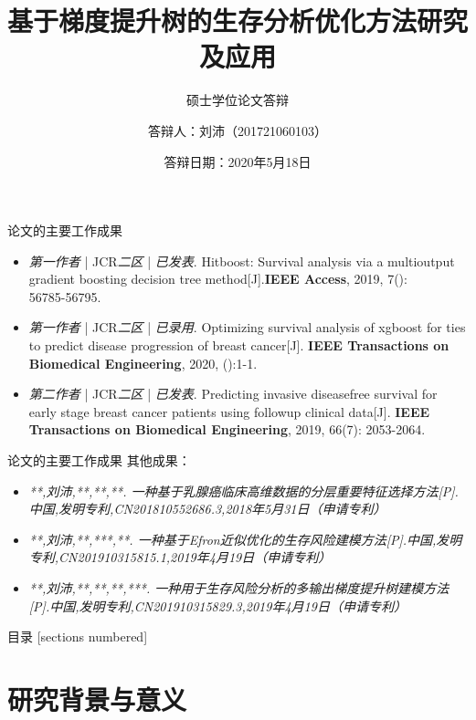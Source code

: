 \documentclass[10pt]{beamer}
\title{基于梯度提升树的生存分析优化方法研究及应用}
\subtitle{硕士学位论文答辩}
\date{答辩日期：2020年5月18日}
\author{答辩人：刘沛（201721060103）}
\institute{电子科技大学计算机科学与工程学院}
\begin{document}
\maketitle

\begin{frame}{论文的主要工作成果}
  \begin{itemize}
    \item \textit{第一作者} | JCR\textit{二区} | \textit{已发表}. Hitboost: Survival analysis via a multi­output gradient boosting decision tree method[J].\textbf{IEEE Access}, 2019, 7(): 56785­-56795.
    \item \textit{第一作者} | JCR\textit{二区} | \textit{已录用}. Optimizing survival analysis of xgboost for ties to predict disease progression of breast cancer[J]. \textbf{IEEE Transactions on Biomedical Engineering}, 2020, ():1-1.
    \item \textit{第二作者} | JCR\textit{二区} | \textit{已发表}. Predicting invasive disease­free survival for early stage breast cancer patients using follow­up clinical data[J]. \textbf{IEEE Transactions on Biomedical Engineering}, 2019, 66(7): 2053­-2064.
  \end{itemize}
\end{frame}

\begin{frame}{论文的主要工作成果}
  其他成果：
  \begin{itemize}
    \item \textit{**,刘沛,**,**,**. 一种基于乳腺癌临床高维数据的分层重要特征选择方法[P].中国,发明专利,CN201810552686.3,2018年5月31日（申请专利）}
    \item \textit{**,刘沛,**,***,**. 一种基于Efron近似优化的生存风险建模方法[P].中国,发明专利,CN201910315815.1,2019年4月19日（申请专利）}
    \item \textit{**,刘沛,**,**,**,***. 一种用于生存风险分析的多输出梯度提升树建模方法[P].中国,发明专利,CN201910315829.3,2019年4月19日（申请专利）}
  \end{itemize}
\end{frame}

\begin{frame}{目录}
  [sections numbered]
  \tableofcontents[hideallsubsections]
\end{frame}

\section{研究背景与意义}
\end{document}
